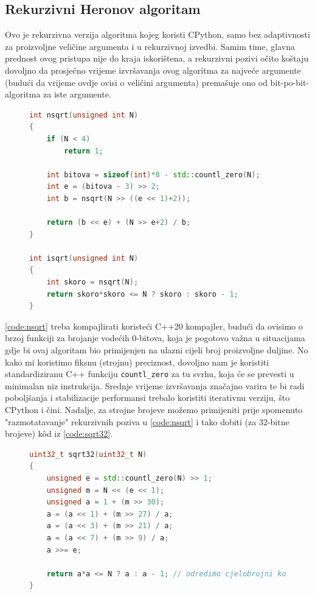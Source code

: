\documentclass[12pt]{scrartcl}
\begin{document}
\subsection{Rekurzivni Heronov algoritam}
Ovo je rekurzivna verzija algoritma kojeg koristi CPython, samo bez adaptivnosti za proizvoljne veličine argumenta i u rekurzivnoj izvedbi.
Samim time, glavna prednost ovog pristupa nije do kraja iskorištena, a rekurzivni pozivi očito koštaju dovoljno da prosječno vrijeme izvršavanja
ovog algoritma za najveće argumente (budući da vrijeme ovdje ovisi o veličini argumenta) premašuje ono od bit-po-bit-algoritma za iste argumente.
\begin{figure}[h]
\begin{lstlisting}[language=C++, label=code:nsqrt, caption=Rekurzivna Heronova metoda u C++20]
int nsqrt(unsigned int N)
{
    if (N < 4)
        return 1;

    int bitova = sizeof(int)*8 - std::countl_zero(N);
    int e = (bitova - 3) >> 2;
    int b = nsqrt(N >> ((e << 1)+2));

    return (b << e) + (N >> e+2) / b;
}

int isqrt(unsigned int N)
{
    int skoro = nsqrt(N);
    return skoro*skoro <= N ? skoro : skoro - 1;
}
\end{lstlisting}
\end{figure}
\autoref{code:nsqrt} treba kompajlirati koristeći C++20 kompajler, budući da ovisimo o brzoj funkciji za brojanje vodećih $0$-bitova, koja je pogotovo
važna u situacijama gdje bi ovaj algoritam bio primijenjen na ulazni cijeli broj proizvoljne duljine. No kako mi koristimo fiksnu (strojnu) preciznost,
dovoljno nam je koristiti standardiziranu C++ funkciju \texttt{countl\_zero} za tu svrhu, koja će se prevesti u minimalan niz instrukcija.
Srednje vrijeme izvršavanja značajno varira te bi radi poboljšanja i stabilizacije performansi trebalo koristiti iterativnu verziju,
što CPython i čini. Nadalje, za strojne brojeve možemo
primijeniti prije spomenuto "razmotatavanje" rekurzivnih poziva
u \autoref{code:nsqrt} i tako dobiti (za $32$-bitne brojeve) k\^od iz \autoref{code:sqrt32}.
\begin{figure}[h]
\begin{lstlisting}[language=C++, label=code:sqrt32, caption=Algoritam za $32$-bitne argumente u C++20~\cite{mdickpaper}]
uint32_t sqrt32(uint32_t N)
{
    unsigned e = std::countl_zero(N) >> 1;
    unsigned m = N << (e << 1);
    unsigned a = 1 + (m >> 30);
    a = (a << 1) + (m >> 27) / a;
    a = (a << 3) + (m >> 21) / a;
    a = (a << 7) + (m >> 9) / a;
    a >>= e;

    return a*a <= N ? a : a - 1; // odredimo cjelobrojni korijen iz skoro-korijena
}
\end{lstlisting}
\end{figure}
\end{document}
